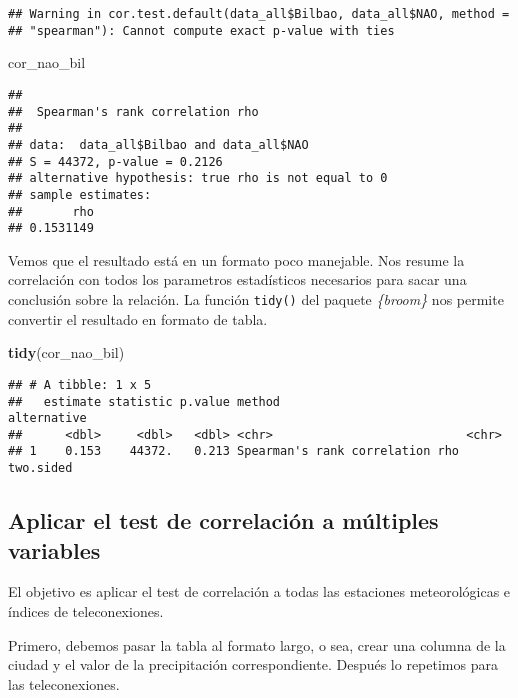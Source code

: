 \documentclass[]{article}
\newenvironment{Shaded}{\begin{snugshade}}{\end{snugshade}}
\newcommand{\KeywordTok}[1]{\textcolor[rgb]{0.13,0.29,0.53}{\textbf{#1}}}
\newcommand{\NormalTok}[1]{#1}
\begin{document}
\begin{verbatim}
## Warning in cor.test.default(data_all$Bilbao, data_all$NAO, method =
## "spearman"): Cannot compute exact p-value with ties
\end{verbatim}

\begin{Shaded}
\begin{Highlighting}[]
\NormalTok{cor_nao_bil}
\end{Highlighting}
\end{Shaded}

\begin{verbatim}
## 
##  Spearman's rank correlation rho
## 
## data:  data_all$Bilbao and data_all$NAO
## S = 44372, p-value = 0.2126
## alternative hypothesis: true rho is not equal to 0
## sample estimates:
##       rho 
## 0.1531149
\end{verbatim}

Vemos que el resultado está en un formato poco manejable. Nos resume la
correlación con todos los parametros estadísticos necesarios para sacar
una conclusión sobre la relación. La función \texttt{tidy()} del paquete
\emph{\{broom\}} nos permite convertir el resultado en formato de tabla.

\begin{Shaded}
\begin{Highlighting}[]
\KeywordTok{tidy}\NormalTok{(cor_nao_bil)}
\end{Highlighting}
\end{Shaded}

\begin{verbatim}
## # A tibble: 1 x 5
##   estimate statistic p.value method                          alternative
##      <dbl>     <dbl>   <dbl> <chr>                           <chr>      
## 1    0.153    44372.   0.213 Spearman's rank correlation rho two.sided
\end{verbatim}

\subsection{Aplicar el test de correlación a múltiples
variables}\label{aplicar-el-test-de-correlacion-a-multiples-variables}

El objetivo es aplicar el test de correlación a todas las estaciones
meteorológicas e índices de teleconexiones.

Primero, debemos pasar la tabla al formato largo, o sea, crear una
columna de la ciudad y el valor de la precipitación correspondiente.
Después lo repetimos para las teleconexiones.
\end{document}
